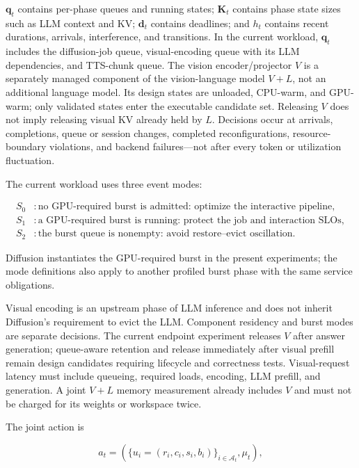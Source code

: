 \documentclass[10pt]{article}
\begin{document}
$\mathbf q_t$ contains per-phase queues and running states; $\mathbf K_t$
contains phase state sizes such as LLM context and KV; $\mathbf d_t$ contains
deadlines; and $h_t$ contains recent durations, arrivals, interference, and
transitions.  In the current workload, $\mathbf q_t$ includes the diffusion-job
queue, visual-encoding queue with its LLM dependencies, and TTS-chunk queue.
The vision encoder/projector $V$ is a separately managed component of the
vision-language model $V+L$, not an additional language model.  Its design
states are unloaded, CPU-warm, and GPU-warm; only validated states enter the
executable candidate set.  Releasing $V$ does not imply releasing visual KV
already held by $L$.  Decisions occur at arrivals, completions, queue or
session changes, completed reconfigurations, resource-boundary violations, and
backend failures---not after every token or utilization fluctuation.

The current workload uses three event modes:

\begin{align*}
S_0 &: \text{no GPU-required burst is admitted: optimize the interactive pipeline},\\
S_1 &: \text{a GPU-required burst is running: protect the job and interaction SLOs},\\
S_2 &: \text{the burst queue is nonempty: avoid restore--evict oscillation}.
\end{align*}

Diffusion instantiates the GPU-required burst in the present experiments; the
mode definitions also apply to another profiled burst phase with the same
service obligations.

Visual encoding is an upstream phase of LLM inference and does not inherit
Diffusion's requirement to evict the LLM.  Component residency and burst modes
are separate decisions.  The current endpoint experiment releases $V$ after
answer generation; queue-aware retention and release immediately after visual
prefill remain design candidates requiring lifecycle and correctness tests.
Visual-request latency must include queueing, required loads, encoding, LLM
prefill, and generation.  A joint $V+L$ memory measurement already includes $V$
and must not be charged for its weights or workspace twice.

The joint action is

\begin{equation}
a_t=\left({\bigl\{u_i=(r_i,c_i,s_i,b_i)\bigr\}}_{i\in\mathcal A_t},\mu_t\right),
\end{equation}
\end{document}
